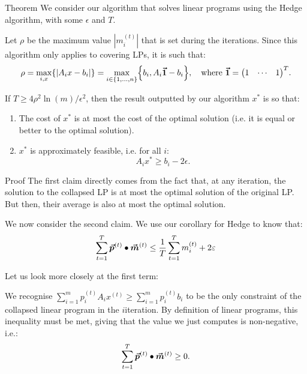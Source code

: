 \documentclass[a4paper]{article}
\begin{document}
\begin{parag}{Theorem}
    We consider our algorithm that solves linear programs using the Hedge algorithm, with some $\epsilon$ and $T$.

    Let $\rho$ be the maximum value $\left|m_i^{\left(t\right)}\right|$ that is set during the iterations. Since this algorithm only applies to covering LPs, it is such that: 
    \[\rho = \max_{i, x}\left\{\left|A_i x - b_i\right|\right\} = \max_{i \in \left\{1, \ldots, n\right\}} \left\{b_i, A_i \bvec{1} - b_i\right\}, \mathspace \text{where } \bvec{1} = \begin{pmatrix} 1 & \cdots & 1 \end{pmatrix}^T.\]

    If $T \geq 4 \rho^2 \ln\left(m\right) / \epsilon^2$, then the result outputted by our algorithm $x^*$ is so that:
    \begin{enumerate}
        \item The cost of $x^*$ is at most the cost of the optimal solution (i.e. it is equal or better to the optimal solution).
        \item $x^*$ is approximately feasible, i.e. for all $i$: 
        \[A_i x^* \geq b_i - 2 \epsilon.\]
    \end{enumerate}
    

    \begin{subparag}{Proof}
        The first claim directly comes from the fact that, at any iteration, the solution to the collapsed LP is at most the optimal solution of the original LP. But then, their average is also at most the optimal solution.

        We now consider the second claim. We use our corollary for Hedge to know that:
        \[\sum_{t=1}^{T} \bvec{p}^{\left(t\right)} \dotprod \bvec{m}^{\left(t\right)} \leq \frac{1}{T} \sum_{t=1}^{T} m_i^{\left(t\right)} + 2\epsilon\]

        Let us look more closely at the first term:
    
        We recognise $\sum_{i=1}^{m} p_i^{\left(t\right)} A_i x^{\left(t\right)} \geq \sum_{i=1}^{m} p_i^{\left(t\right)} b_i$ to be the only constraint of the collapsed linear program in the $i$\Th iteration. By definition of linear programs, this inequality must be met, giving that the value we just computes is non-negative, i.e.:
        \[\sum_{t=1}^{T} \bvec{p}^{\left(t\right)} \dotprod \bvec{m}^{\left(t\right)} \geq 0.\]


\end{subparag}
\end{parag}
\end{document}

